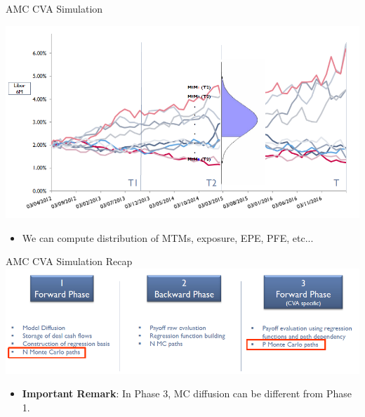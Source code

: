 \documentclass[11pt]{beamer}
\begin{document}
\begin{frame}{AMC CVA Simulation}
\begin{center}
\includegraphics[scale=.4]{img/AMC9.PNG} 
\end{center}
\begin{itemize}
\scriptsize
\item We can compute distribution of MTMs, exposure, EPE, PFE, etc... 
\normalsize
\end{itemize}
\end{frame}
\begin{frame}{AMC CVA Simulation}
Recap
\includegraphics[scale=.5]{img/AMC10.PNG} 
\begin{itemize}
\item \textbf{Important Remark}: In Phase 3, MC diffusion can be different from Phase 1.
\end{itemize}
\end{frame}
\end{document}
